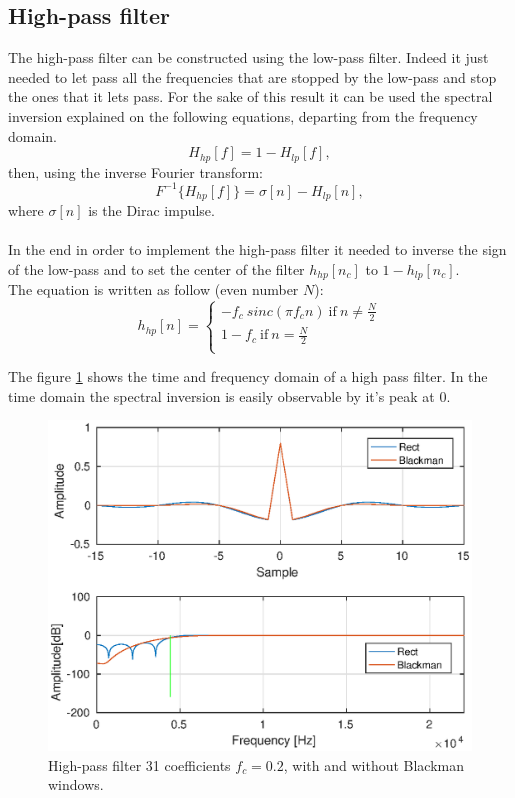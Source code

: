 \documentclass[twoside,twocolumn]{article}
\begin{document}
\subsection{High-pass filter}
The high-pass filter can be constructed using the low-pass filter. Indeed it just needed to let pass all the frequencies that are stopped by the low-pass and stop the ones that it lets	 pass. For the sake of this result it can be used the spectral inversion explained on the following equations, departing from the frequency domain.\\
\begin{equation}
H_{hp}[f]=1-H_{lp}[f],
\end{equation}
then, using the inverse Fourier transform:
\begin{equation}
F^{-1}\lbrace H_{hp}[f] \rbrace=\sigma[n]-H_{lp}[n],
\end{equation}
where $\sigma[n]$ is the Dirac impulse.\\ \\
In the end  in order to implement the high-pass filter it needed to inverse the sign of the low-pass and to set the center of the filter	$h_{hp}[n_c]$ to $1-h_{lp}[n_{c}]$.\\
The equation is written as follow (even number $N$):
\begin{equation}
h_{hp}[n]=
\left\{
\begin{aligned}
-f_c\  sinc(\pi f_cn) \ \text{if}\ n\neq \frac{N}{2} \\
1-f_c \ \text{if}\ n=\frac{N}{2}\\
\end{aligned}
\right.
\end{equation}

The figure \ref{highpass} shows the time and frequency domain of a high pass filter. In the time domain the spectral inversion is easily observable by it's peak at 0.
\begin{figure}[h!]
	\centering
	\includegraphics[scale=0.5]{./images/highpass.eps}
	\caption{High-pass filter 31 coefficients $f_c=0.2$, with and without Blackman windows.}
	\label{highpass}
\end{figure}
\end{document}
